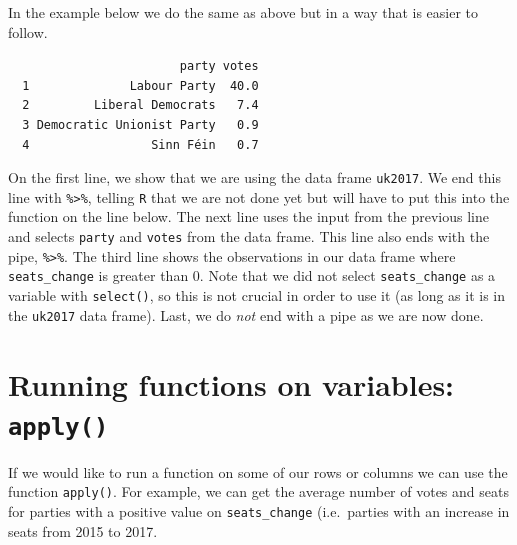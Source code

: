 \documentclass[12pt,oneside]{reedthesis}
\theoremstyle{definition}
\theoremstyle{definition}
\theoremstyle{definition}
\theoremstyle{remark}
\begin{document}
  In the example below we do the same as above but in a way that is easier
  to follow.
  \begin{Shaded}
  \end{Shaded}
  \begin{verbatim}
                        party votes
  1              Labour Party  40.0
  2         Liberal Democrats   7.4
  3 Democratic Unionist Party   0.9
  4                 Sinn Féin   0.7
  \end{verbatim}
  On the first line, we show that we are using the data frame
  \texttt{uk2017}. We end this line with \texttt{\%\textgreater{}\%},
  telling \texttt{R} that we are not done yet but will have to put this
  into the function on the line below. The next line uses the input from
  the previous line and selects \texttt{party} and \texttt{votes} from the
  data frame. This line also ends with the pipe,
  \texttt{\%\textgreater{}\%}. The third line shows the observations in
  our data frame where \texttt{seats\_change} is greater than 0. Note that
  we did not select \texttt{seats\_change} as a variable with
  \texttt{select()}, so this is not crucial in order to use it (as long as
  it is in the \texttt{uk2017} data frame). Last, we do \emph{not} end
  with a pipe as we are now done.
  
  \section{\texorpdfstring{Running functions on variables:
  \texttt{apply()}}{Running functions on variables: apply()}}\label{running-functions-on-variables-apply}
  
  If we would like to run a function on some of our rows or columns we can
  use the function \texttt{apply()}. For example, we can get the average
  number of votes and seats for parties with a positive value on
  \texttt{seats\_change} (i.e.~parties with an increase in seats from 2015
  to 2017.
  
\end{document}
